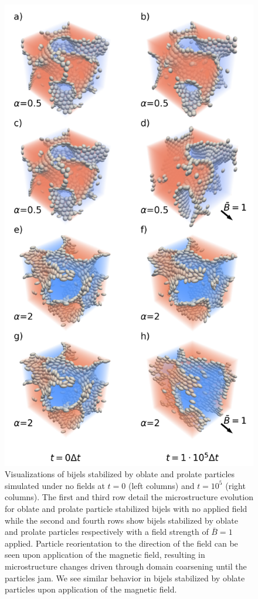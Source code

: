 \begin{figure} 
\centering 
\includegraphics[scale=0.4]{../figures/results/paper2/microstructure_viz-field_on.png} 
\caption{Visualizations of bijels stabilized by oblate and prolate particles simulated under no fields at $t = 0$ (left columns) and $t = 10^5$ (right columns). The first and third row detail the microstructure evolution for oblate and prolate particle stabilized bijels with no applied field while the second and fourth rows show bijels stabilized by oblate and prolate particles respectively with a field strength of $\bar{B} = 1$ applied. Particle reorientation to the direction of the field can be seen upon application of the magnetic field, resulting in microstructure changes driven through domain coarsening until the particles jam. We see similar behavior in bijels stabilized by oblate particles upon application of the magnetic field.}
\label{fig:microstructure_viz-field_on} 
\end{figure}

